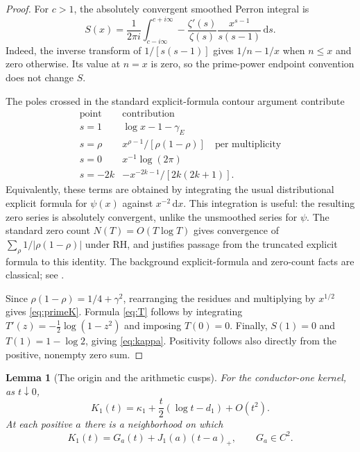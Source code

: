 \documentclass[11pt]{article}
\newtheorem{lemma}[theorem]{Lemma}
\theoremstyle{definition}
\newcommand{\dd}{\,\mathrm d}
\newcommand{\gE}{\gamma_{\!E}}
\newcommand{\kap}{\kappa}
\begin{document}
\begin{proof}
For $c>1$, the absolutely convergent smoothed Perron integral is
\[
 S(x)=\frac1{2\pi i}\int_{c-i\infty}^{c+i\infty}
       -\frac{\zeta'(s)}{\zeta(s)}\frac{x^{s-1}}{s(s-1)}\dd s.
\]
Indeed, the inverse transform of $1/[s(s-1)]$ gives $1/n-1/x$ when
$n\le x$ and zero otherwise. Its value at $n=x$ is zero, so the prime-power
endpoint convention does not change $S$.

The poles crossed in the standard explicit-formula contour argument contribute
\[
\begin{array}{c|c}
\text{point}&\text{contribution}\\ \hline
s=1&\log x-1-\gE\\
s=\rho&x^{\rho-1}/[\rho(1-\rho)]\quad\text{per multiplicity}\\
s=0&x^{-1}\log(2\pi)\\
s=-2k&-x^{-2k-1}/[2k(2k+1)].
\end{array}
\]
Equivalently, these terms are obtained by integrating the usual distributional
explicit formula for $\psi(x)$ against $x^{-2}\dd x$. This integration is useful:
the resulting zero series is absolutely convergent, unlike the unsmoothed
series for $\psi$. The standard zero count $N(T)=O(T\log T)$ gives convergence
of $\sum_\rho 1/|\rho(1-\rho)|$ under RH, and justifies passage from the truncated
explicit formula to this identity. The background explicit-formula and zero-count
facts are classical; see \cite{suzuki,titchmarsh}.

Since $\rho(1-\rho)=1/4+\gamma^2$, rearranging the residues and multiplying by
$x^{1/2}$ gives \cref{eq:primeK}. Formula \cref{eq:T} follows by integrating
$T'(z)=-\tfrac12\log(1-z^2)$ and imposing $T(0)=0$.
Finally, $S(1)=0$ and $T(1)=1-\log2$, giving \cref{eq:kappa}.
Positivity follows also directly from the positive, nonempty zero sum.
\end{proof}

\begin{lemma}[The origin and the arithmetic cusps]\label{lem:local}
For the conductor-one kernel, as $t\downarrow0$,
\begin{equation}\label{eq:localzeta}
 K_1(t)=\kap_1+\frac t2(\log t-d_1)+O(t^2).
\end{equation}
At each positive $a$ there is a neighborhood on which
\begin{equation}\label{eq:normalform}
 K_1(t)=G_a(t)+J_1(a)(t-a)_+,
 \qquad G_a\in C^2.
\end{equation}
\end{lemma}
\end{document}
